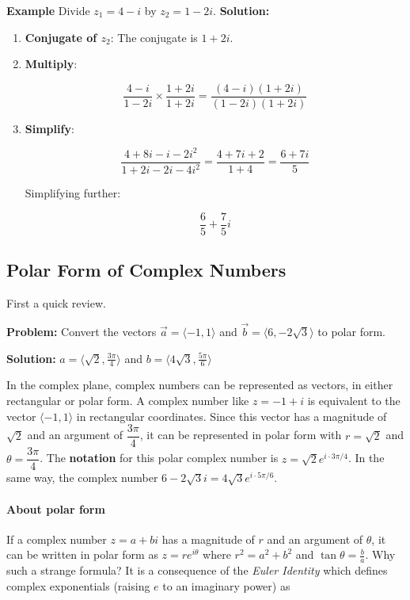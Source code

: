\documentclass[
]{article}
\begin{document}
\textbf{Example} Divide \(z_1 = 4 - i\) by \(z_2 = 1 - 2i\).
\textbf{Solution:}

\begin{enumerate}
\def\labelenumi{\arabic{enumi}.}
\item
  \textbf{Conjugate of \(z_2\)}: The conjugate is \(1 + 2i\).
\item
  \textbf{Multiply}:

  \[
  \frac{4 - i}{1 - 2i} \times \frac{1 + 2i}{1 + 2i} = \frac{(4 - i)(1 + 2i)}{(1 - 2i)(1 + 2i)}
  \]
\item
  \textbf{Simplify}:

  \[
  \frac{4 + 8i - i - 2i^2}{1 + 2i - 2i - 4i^2} = \frac{4 + 7i + 2}{1 + 4} = \frac{6 + 7i}{5}
  \]

  Simplifying further:

  \[
  \frac{6}{5} + \frac{7}{5}i
  \]
\end{enumerate}

\subsection{Polar Form of Complex
Numbers}\label{polar-form-of-complex-numbers}

First a quick review.

\textbf{Problem:} Convert the vectors \(\vec{a} = \langle -1,1 \rangle\)
and \(\vec{b} = \langle 6,-2\sqrt3 \rangle\) to polar form.

\textbf{Solution:} \(a =  \langle \sqrt2, \frac{3\pi}{4} \rangle\) and
\(b =  \langle 4\sqrt3, \frac{5\pi}{6} \rangle\)

In the complex plane, complex numbers can be represented as vectors, in
either rectangular or polar form. A complex number like \(z=-1 + i\) is
equivalent to the vector \(\langle -1, 1 \rangle\) in rectangular
coordinates. Since this vector has a magnitude of \(\sqrt{2}\) and an
argument of \(\dfrac{3\pi}{4}\), it can be represented in polar form
with \(r = \sqrt2\) and \(\theta=\dfrac{3\pi}{4}\). The
\textbf{notation} for this polar complex number is
\(z=\sqrt2 e^{i \cdot 3\pi/4}\). In the same way, the complex number
\(6-2\sqrt3 i = 4\sqrt3 e^{i \cdot 5\pi/6}\).

\paragraph{About polar form}\label{about-polar-form}

If a complex number \(z=a+bi\) has a magnitude of \(r\) and an argument
of \(\theta\), it can be written in polar form as \(z = r e^{i \theta}\)
where \(r^2 = a^2 + b^2\) and \(\tan \theta = \frac{b}{a}\). Why such a
strange formula? It is a consequence of the \emph{Euler Identity} which
defines complex exponentials (raising \(e\) to an imaginary power) as
\end{document}
